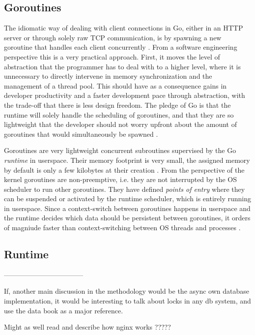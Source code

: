 \subsection{Goroutines}
The idiomatic way of dealing with client connections in Go, either in an HTTP server or through solely raw TCP communication, is by spawning a new goroutine that handles each client concurrently \cite{Morsing2013_2}\cite{GoNet}\cite{GoHTTP}. From a software engineering perspective this is a very practical approach. First, it moves the level of abstraction that the programmer has to deal with to a higher level, where it is unnecessary to directly intervene in memory synchronization and the management of a thread pool. This should have as a consequence gains in developer productivity and a faster development pace through abstraction, with the trade-off that there is less design freedom. The pledge of Go is that the runtime will solely handle the scheduling of goroutines, and that they are so lightweight that the developer should not worry upfront about the amount of goroutines that would simultaneously be spawned \cite{Cox-Buday2017}.

Goroutines are very lightweight concurrent subroutines  supervised by the Go \textit{runtime} in userspace. Their memory footprint is very small, the assigned memory by default is only a few kilobytes at their creation \cite{Cox-Buday2017}. From the perspective of the kernel goroutines are non-preemptive, i.e. they are not interrupted by the OS scheduler to run other goroutines. They have defined \textit{points of entry} where they can be suspended or activated by the runtime scheduler, which is entirely running in userspace. Since a context-switch between goroutines happens in userspace and the runtime decides which data should be persistent between goroutines, it orders of magniude faster than context-switching between OS threads \cite{Cox-Buday2017} and processes \cite{Kerrisk2010}.

\subsection{Runtime}

-----------------------------------

If, another main discussion in the methodology would be the async own database implementation, it would be interesting to talk about locks in any db system, and use the data book as a major reference.

Might as well read and describe how nginx works ?????
